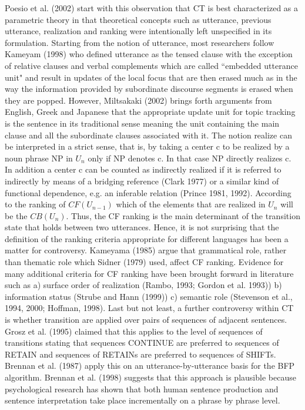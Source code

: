 Poesio et al. (2002) start with this observation that CT is best characterized as a parametric theory in that theoretical concepts such as utterance, previous utterance, realization and ranking were intentionally left unspecified in its formulation. 
Starting from the notion of utterance, most researchers follow Kameyam (1998) who defined utterance as the tensed clause with the exception of relative clauses and verbal complements which are called ``embedded utterance unit" and result in updates of the local focus that are then erased much as in the way the information provided by subordinate discourse segments is erased when they are popped. 
However, Miltsakaki (2002) brings forth arguments from English, Greek and Japanese that the appropriate update unit for topic tracking is the sentence in its traditional sense meaning the unit containing the main clause and all the subordinate clauses associated with it. 
The notion realize can be interpreted in a strict sense, that is, by taking a center c to be realized by a noun phrase NP in $U_n$ only if NP denotes c. 
In that case NP directly realizes c. In addition a center c can be counted as indirectly realized if it is referred to indirectly by means of a bridging reference (Clark 1977) or a similar kind of functional dependence, e.g. an inferable relation (Prince 1981, 1992). 
According to the ranking of $CF(U_{n-1})$ which of the elements that are realized in $U_n$ will be the $CB(U_n)$. 
Thus, the CF ranking is the main determinant of the transition state that holds between two utterances. 
Hence, it is not surprising that the definition of the ranking criteria appropriate for different languages has been a matter for controversy. 
Kameyama (1985) argue that grammatical role, rather than thematic role which Sidner (1979) used, affect CF ranking. Evidence for many additional criteria for CF ranking have been brought forward in literature such as a) surface order of realization (Rambo, 1993; Gordon et al. 1993)) b) information status (Strube and Hann (1999)) c) semantic role (Stevenson et al., 1994, 2000; Hoffman, 1998).
Last but not least, a further controversy within CT is whether transition are applied over pairs of sequences of adjacent sentences. 
Grosz et al. (1995) claimed that this applies to the level of sequences of transitions stating that sequences CONTINUE are preferred to sequences of RETAIN and sequences of RETAINs are preferred to sequences of SHIFTs. 
Brennan et al. (1987) apply this on an utterance-by-utterance basis for the BFP algorithm. Brennan et al. (1998) suggests that this approach is plausible because psychological research has shown that both human sentence production and sentence interpretation take place incrementally on a phrase by phrase level. 
